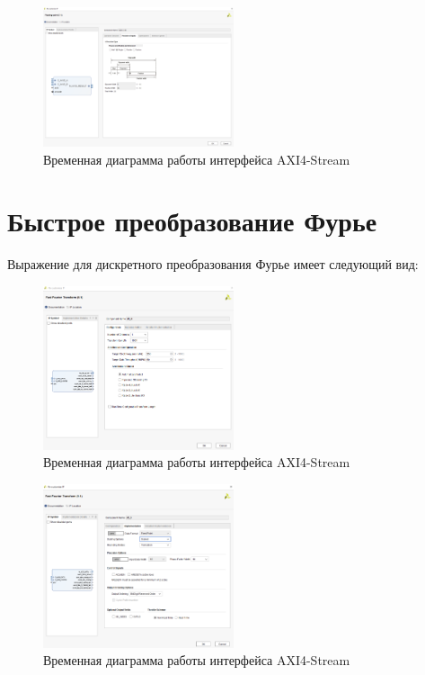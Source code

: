 \documentclass[a4paper,oneside ,14pt]{extreport}
\begin{document}
\begin{figure}[h]
	\centering
	\includegraphics[width=0.5\textwidth]{image/fp_precision_type.png}
	\caption{Временная диаграмма работы интерфейса AXI4-Stream}
	\label{fp_precision_type}
\end{figure}

\section{Быстрое преобразование Фурье}
	Выражение для дискретного преобразования Фурье имеет следующий вид:
	
\begin{figure}[h]
	\centering
	\includegraphics[width=0.5\textwidth]{image/fft_config.png}
	\caption{Временная диаграмма работы интерфейса AXI4-Stream}
	\label{fft_config}
\end{figure}
	
\begin{figure}[h]
	\centering
	\includegraphics[width=0.5\textwidth]{image/fft_implemetation.png}
	\caption{Временная диаграмма работы интерфейса AXI4-Stream}
	\label{fft_implemetation}
\end{figure}
	
\end{document}
